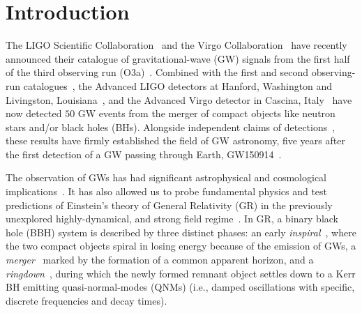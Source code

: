 \documentclass[twocolumn,prd,aps,superscriptaddress,preprintnumbers,tightenlines,showpacs,nofootinbib,eqsecnum,amsfonts,amsmath]{revtex4-1}
\begin{document}
\maketitle

\section{Introduction}
\label{sec:intro}
The LIGO Scientific Collaboration~\cite{lsc} and the Virgo
Collaboration~\cite{Virgo} have recently announced their catalogue of
gravitational-wave (GW) signals from the first
half of the third observing run (O3a)~\cite{Abbott:2020niy}. Combined
with the first and second observing-run catalogues~\cite{LIGOScientific:2018mvr}, the Advanced LIGO detectors at Hanford,
Washington and Livingston, Louisiana~\cite{TheLIGOScientific:2014jea},
and the Advanced Virgo detector in Cascina,
Italy~\cite{TheVirgo:2014hva} have now detected $50$ GW
events from the merger of compact objects like neutron stars and/or
black holes (BHs). Alongside independent claims of
detections~\cite{Nitz:2018imz,Nitz:2019hdf,Venumadhav:2019lyq,Zackay:2019btq}, these results have firmly established the field of GW astronomy, five years after the first detection of a GW passing through Earth, GW150914~\cite{Abbott:2016blz}.

The observation of GWs has had significant astrophysical and cosmological
implications~\cite{TheLIGOScientific:2016htt,GBM:2017lvd,Monitor:2017mdv,Abbott:2017xzu}. It
has also allowed us to probe fundamental
physics and test predictions of Einstein's theory of General Relativity
(GR) in the previously unexplored highly-dynamical, and strong field
regime~\cite{TheLIGOScientific:2016src,Abbott:2018lct,LIGOScientific:2019fpa,Abbott:2020jks}. In GR, a binary black hole (BBH) system is described by
three distinct phases: an early \textit{inspiral}~\cite{Blanchet:2013haa}, where the two
compact objects spiral in losing energy because of the emission of GWs, a \textit{merger}~\cite{Pretorius:2005gq,Campanelli:2005dd,Baker:2005vv} marked by the
formation of a common apparent horizon, and a \textit{ringdown}~\cite{Vishveshwara:1970zz,Vishveshwara:1970cc,Press:1971wr,Chandrasekhar:1975zza,Detweiler:1980gk}, during which the newly formed remnant object settles down to a Kerr BH emitting quasi-normal-modes (QNMs) (i.e., damped oscillations with specific, discrete frequencies and decay times). 
\end{document}
